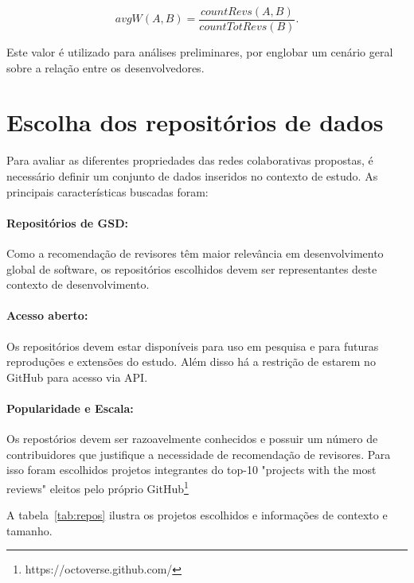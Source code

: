 \documentclass[a4paper,12pt]{monografia}
\theoremstyle{plain}
\theoremstyle{definition}
\theoremstyle{remark}
\begin{document}
\begin{equation}\label{eq:avg_weight}
	avgW(A,B) = \dfrac{countRevs(A,B)}{countTotRevs(B)}.
\end{equation}

Este valor é utilizado para análises preliminares, por englobar um cenário geral sobre a relação entre os desenvolvedores.



\section{Escolha dos repositórios de dados}

Para avaliar as diferentes propriedades das redes colaborativas propostas, é necessário definir um conjunto de dados inseridos no contexto de estudo. As principais características buscadas foram:

\paragraph{Repositórios de GSD:} Como a recomendação de revisores têm maior relevância em desenvolvimento global de software, os repositórios escolhidos devem ser representantes deste contexto de desenvolvimento.

\paragraph{Acesso aberto: } Os repositórios devem estar disponíveis para uso em pesquisa e para futuras reproduções e extensões do estudo. Além disso há a restrição de estarem no GitHub para acesso via API.

\paragraph{Popularidade e Escala:} Os repostórios devem ser razoavelmente conhecidos e possuir um número de contribuidores que justifique a necessidade de recomendação de revisores. Para isso foram escolhidos projetos integrantes do top-10 "projects with the most reviews" eleitos pelo próprio GitHub\footnote{https://octoverse.github.com/}

A tabela~\ref{tab:repos} ilustra os projetos escolhidos e informações de contexto e tamanho.
\end{document}
